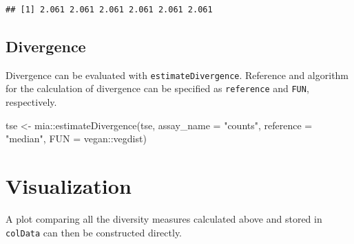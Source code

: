 \documentclass[
]{book}
\newenvironment{Shaded}{\begin{snugshade}}{\end{snugshade}}
\newcommand{\AttributeTok}[1]{\textcolor[rgb]{0.77,0.63,0.00}{#1}}
\newcommand{\FunctionTok}[1]{\textcolor[rgb]{0.00,0.00,0.00}{#1}}
\newcommand{\NormalTok}[1]{#1}
\newcommand{\OtherTok}[1]{\textcolor[rgb]{0.56,0.35,0.01}{#1}}
\newcommand{\SpecialCharTok}[1]{\textcolor[rgb]{0.00,0.00,0.00}{#1}}
\newcommand{\StringTok}[1]{\textcolor[rgb]{0.31,0.60,0.02}{#1}}
\begin{document}
\begin{verbatim}
## [1] 2.061 2.061 2.061 2.061 2.061 2.061
\end{verbatim}

\hypertarget{divergence}{%
\subsection{Divergence}\label{divergence}}

Divergence can be evaluated with \texttt{estimateDivergence}. Reference and algorithm for the calculation of divergence can be specified as \texttt{reference} and \texttt{FUN}, respectively.

\begin{Shaded}
\begin{Highlighting}[]
\NormalTok{tse }\OtherTok{\textless{}{-}}\NormalTok{ mia}\SpecialCharTok{::}\FunctionTok{estimateDivergence}\NormalTok{(tse,}
                               \AttributeTok{assay\_name =} \StringTok{"counts"}\NormalTok{,}
                               \AttributeTok{reference =} \StringTok{"median"}\NormalTok{,}
                               \AttributeTok{FUN =}\NormalTok{ vegan}\SpecialCharTok{::}\NormalTok{vegdist)}
\end{Highlighting}
\end{Shaded}

\hypertarget{visualization}{%
\section{Visualization}\label{visualization}}

A plot comparing all the diversity measures calculated above and stored in \texttt{colData} can then be constructed directly.
\end{document}
